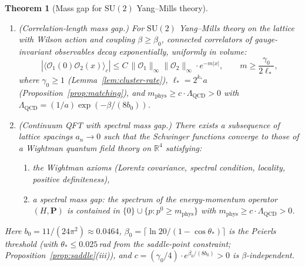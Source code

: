 \documentclass[11pt]{article}
\newtheorem{theorem}{Theorem}[section]
\theoremstyle{definition}
\newcommand{\SU}{\mathrm{SU}}
\newcommand{\R}{\mathbb{R}}
\newcommand{\Lam}{\Lambda_{\mathrm{QCD}}}
\begin{document}
\begin{theorem}[Mass gap for $\SU(2)$ Yang--Mills theory]%
\label{thm:unconditional}
\mbox{}
\begin{enumerate}[label=(\Alph*)]
\item \emph{(Correlation-length mass gap.)}
For $\SU(2)$ Yang--Mills theory on the lattice with Wilson action
and coupling $\beta\ge\beta_0$, connected correlators of gauge-invariant
observables decay exponentially, uniformly in volume:
\begin{equation}
|\langle\mathcal{O}_1(0)\mathcal{O}_2(x)\rangle_c|
\le C\,\|\mathcal{O}_1\|_\infty\|\mathcal{O}_2\|_\infty
\cdot e^{-m|x|},
\qquad
m\ge\frac{\gamma_0}{2\ell_*},
\end{equation}
where $\gamma_0\ge 1$ (Lemma~\ref{lem:cluster-rate}),
$\ell_*=2^{k_*}a$ (Proposition~\ref{prop:matching}), and
$m_{\mathrm{phys}}\ge c\cdot\Lam>0$ with
$\Lam=(1/a)\exp(-\beta/(8b_0))$.

\item \emph{(Continuum QFT with spectral mass gap.)}
There exists a subsequence of lattice spacings $a_n\to 0$ such that
the Schwinger functions converge to those of a Wightman quantum field
theory on $\R^4$ satisfying:
\begin{enumerate}[nosep,label=(\roman*)]
\item the Wightman axioms (Lorentz covariance, spectral condition,
locality, positive definiteness),
\item a spectral mass gap: the spectrum of the energy-momentum
operator $(H,\mathbf{P})$ is contained in
$\{0\}\cup\{p:p^0\ge m_{\mathrm{phys}}\}$ with
$m_{\mathrm{phys}}\ge c\cdot\Lam>0$.
\end{enumerate}
\end{enumerate}
Here $b_0=11/(24\pi^2)\approx 0.0464$,
$\beta_0=\lceil\ln 20/(1-\cos\theta_*)\rceil$ is the Peierls threshold
(with $\theta_*\le 0.025$\,rad from the saddle-point constraint;
Proposition~\ref{prop:saddle}(iii)), and
$c=(\gamma_0/4)\cdot e^{\beta_0/(8b_0)}>0$ is $\beta$-independent.
\end{theorem}
\end{document}
